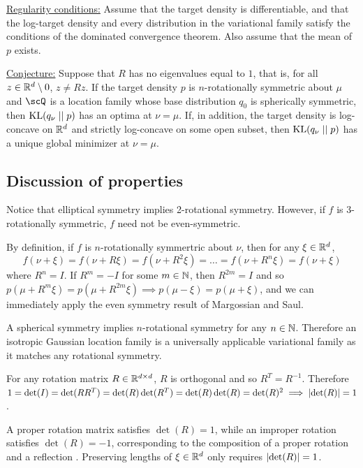 \documentclass{article}
\begin{document}
\underline{Regularity conditions:}
Assume that the target density is differentiable,
and that the log-target density and every distribution in the variational family satisfy the conditions of the dominated convergence theorem.
Also assume that the mean of $p$ exists.

\underline{Conjecture:} Suppose that $R$ has no eigenvalues equal to $1$, that is, for all $z \in \mathbb{R}^d \setminus {0}$, $z \neq Rz$.
If the target density $p$ is $n$-rotationally symmetric about $\mu$ and $\scQ$ is a location family whose base distribution $q_0$ is spherically symmetric, then $\operatorname{KL}(q_{\nu} \; || \; p)$ has an optima at $\nu = \mu$.
If, in addition, the target density is log-concave on $\mathbb{R}^d$ and strictly log-concave on some open subset, then $\operatorname{KL}(q_{\nu} \; || \; p)$ has a unique global minimizer at $\nu = \mu$.




\subsection{Discussion of properties}

Notice that elliptical symmetry implies 2-rotational symmetry.
However, if $f$ is 3-rotationally symmetric, $f$ need not be even-symmetric.

By definition, if $f$ is $n$-rotationally symmertric about $\nu$, then for any $\xi \in \mathbb{R}^d$,
\[
    f(\nu + \xi) = f(\nu + R \xi) = f(\nu + R^2 \xi) = \dots = f(\nu + R^n \xi) = f(\nu + \xi)
\]
where $R^n = I$.
If $R^m = -I$ for some $m \in \mathbb{N}$, then $R^{2m} = I$ and so $p(\mu + R^m \xi) = p(\mu + R^{2m}\xi) \implies p(\mu - \xi) = p(\mu + \xi)$,
and we can immediately apply the even symmetry result of Margossian and Saul.

A spherical symmetry implies $n$-rotational symmetry for any $n \in \mathbb{N}$.
Therefore an isotropic Gaussian location family is a universally applicable variational family as it matches any rotational symmetry.

For any rotation matrix $R \in \mathbb{R} ^{d \times d}$, $R$ is orthogonal and so $R^T = R^{-1}$.
Therefore $1 = \det(I) = \det(RR^T) = \det(R) \det(R^T) = \det(R) \det(R) = \det(R)^2 \implies \lvert\det (R)\rvert = 1$.

A proper rotation matrix satisfies $\det(R) = 1$, while an improper rotation satisfies $\det(R) = -1$,
corresponding to the composition of a proper rotation and a reflection \cite{d2022eigenstructure, morawiec2003orientations}.
Preserving lengths of $\xi \in \mathbb{R}^d$ only requires $\lvert\det(R)\rvert = 1$.
\end{document}
